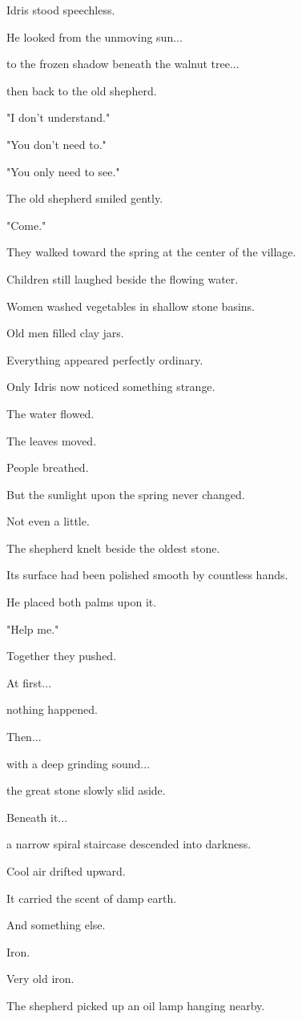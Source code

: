 \documentclass[12pt,openany]{book}
\begin{document}
Idris stood speechless.

He looked from the unmoving sun...

to the frozen shadow beneath the walnut tree...

then back to the old shepherd.

"I don't understand."

"You don't need to."

"You only need to see."

The old shepherd smiled gently.

"Come."

They walked toward the spring at the center of the village.

Children still laughed beside the flowing water.

Women washed vegetables in shallow stone basins.

Old men filled clay jars.

Everything appeared perfectly ordinary.

Only Idris now noticed something strange.

The water flowed.

The leaves moved.

People breathed.

But the sunlight upon the spring never changed.

Not even a little.

The shepherd knelt beside the oldest stone.

Its surface had been polished smooth by countless hands.

He placed both palms upon it.

"Help me."

Together they pushed.

At first...

nothing happened.

Then...

with a deep grinding sound...

the great stone slowly slid aside.

Beneath it...

a narrow spiral staircase descended into darkness.

Cool air drifted upward.

It carried the scent of damp earth.

And something else.

Iron.

Very old iron.

The shepherd picked up an oil lamp hanging nearby.
\end{document}
